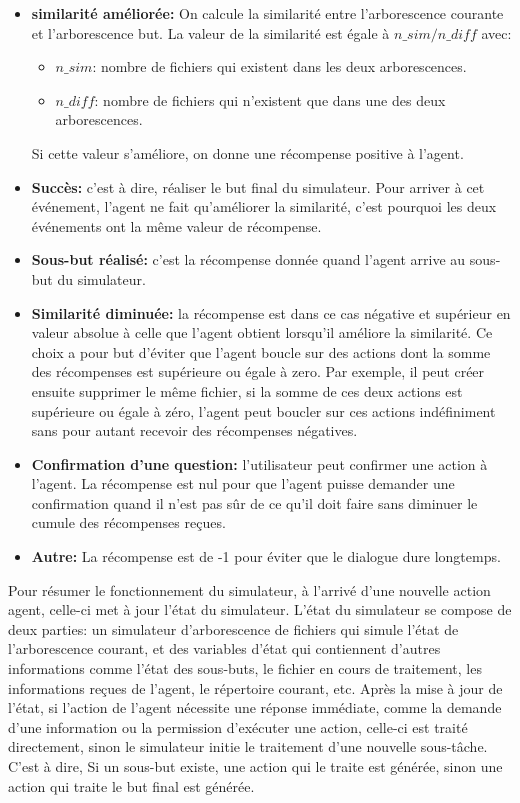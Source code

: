 \begin{itemize}
	\item \textbf{similarité améliorée:} On calcule la similarité entre l'arborescence courante et l'arborescence but. La valeur de la similarité est égale à $n\_sim/n\_diff$ avec: 
	\begin{itemize}
		\item $n\_sim$: nombre de fichiers qui existent dans les deux arborescences.
		\item $n\_diff$: nombre de fichiers qui n'existent que dans une des deux arborescences.  
	\end{itemize}
	Si cette valeur s'améliore, on donne une récompense positive à l'agent.
	\item \textbf{Succès:} c'est à dire, réaliser le but final du simulateur. Pour arriver à cet événement, l'agent ne fait qu'améliorer la similarité, c'est pourquoi les deux événements ont la même valeur de récompense.
	\item \textbf{Sous-but réalisé:} c'est la récompense donnée quand l'agent arrive au sous-but du simulateur.
	\item \textbf{Similarité diminuée:} la récompense est dans ce cas négative et supérieur en valeur absolue à celle que l'agent obtient lorsqu'il améliore la similarité. Ce choix a pour but d'éviter que l'agent boucle sur des actions dont la somme des récompenses est supérieure ou égale à zero. Par exemple, il peut créer ensuite supprimer le même fichier, si la somme de ces deux actions est supérieure ou égale à zéro, l'agent peut boucler sur ces actions indéfiniment sans pour autant recevoir des récompenses négatives.
	\item \textbf{Confirmation d'une question:} l'utilisateur peut confirmer une action à l'agent. La récompense est nul pour que l'agent puisse demander une confirmation quand il n'est pas sûr de ce qu'il doit faire sans diminuer le cumule des récompenses reçues.
	\item \textbf{Autre:} La récompense est de -1 pour éviter que le dialogue dure longtemps. 
\end{itemize}
Pour résumer le fonctionnement du simulateur, à l'arrivé d'une nouvelle action agent, celle-ci met à jour l'état du simulateur. L'état du simulateur se compose de deux parties: un simulateur d'arborescence de fichiers qui simule l'état de l'arborescence courant, et des variables d'état qui contiennent d'autres informations comme l'état des sous-buts, le fichier en cours de traitement, les informations reçues de l'agent, le répertoire courant, etc. Après la mise à jour de l'état, si l'action de l'agent nécessite une réponse immédiate, comme la demande d'une information ou la permission d'exécuter une action, celle-ci est traité directement, sinon le simulateur initie le traitement d'une nouvelle sous-tâche. C'est à dire, Si un sous-but existe, une action qui le traite est générée, sinon une action qui traite le but final est générée.
